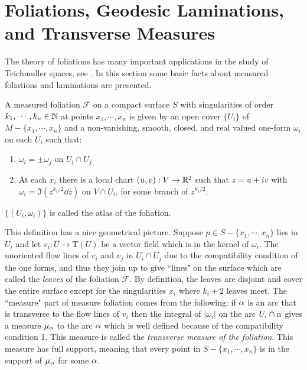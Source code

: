\section{Foliations, Geodesic Laminations, and Transverse Measures}
The theory of foliations has many important applications in the study of Teichmuller spaces, see \cite{FLP}. In this section some basic facts about measured foliations and laminations are presented.
\begin{definition}
  A measured foliation $\mathscr{F}$ on a compact surface $S$ with singularities of order $k_1,\cdots, k_n \in \mathbb{N}$ at points $x_1,\cdots,x_n$ is given by an open cover $\{U_i\}$ of $M-\{x_1,\cdots, x_n\}$ and a non-vanishing, smooth, closed, and real valued one-form $\omega_i$ on each $U_i$ such that:
  \begin{enumerate} 
	\item $\omega_i = \pm\omega_j$ on $U_i\cap U_j$
	\item At each $x_i$ there is a local chart $(u,v):V\to \mathbb{R}^2$ such that $z=u+iv$ with $\omega_i = \Im(z^{k_i/2} \dd z)$ on $V\cap U_i$, for some branch of $z^{k_i/2}$.
  \end{enumerate}
  $\{(U_i,\omega_i)\}$ is called the atlas of the foliation.
\end{definition}
This definition has a nice geometrical picture. Suppose $p\in S-\{x_1,\cdots,x_n\}$ lies in $U_i$ and let $v_i:U\to \text{T}(U)$ be a vector field which is in the kernel of $\omega_i$. The unoriented flow lines of $v_i$ and $v_j$ in $U_i\cap U_j$ due to the compatibility condition of the one forms, and thus they join up to give ``lines" on the surface which are called the \textit{leaves} of the foliation $ \mathscr{F}$. By definition, the leaves are disjoint and cover the entire surface except for the singularities $x_i$ where $k_i+2$ leaves meet. The ``measure" part of measure foliation comes from the following: if $\alpha$ is an arc that is transverse to the flow lines of $v_i$ then the integral of $|\omega_i|$ on the arc $U_i\cap \alpha$ gives a measure $\mu_\alpha$ to the arc $\alpha$ which is well defined because of the compatibility condition 1. This measure is called the \textit{transverse measure of the foliation}. This measure has full support, meaning that every point in $S-\{x_1,\cdots,x_n\}$ is in the support of $\mu_\alpha$ for some $\alpha$.\\

